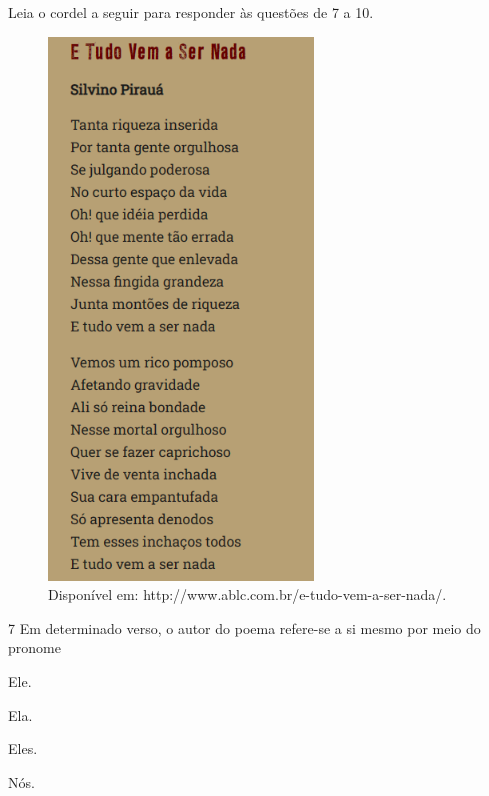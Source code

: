 


Leia o cordel a seguir para responder às questões de 7 a 10.

\begin{figure}[H]
\centering\includegraphics[width=2.77524in,height=5.66716in]{./imgSAEB_6_POR/media/image49.png}
\caption{Disponível em: http://www.ablc.com.br/e-tudo-vem-a-ser-nada/.}
\end{figure}


\num{7} Em determinado verso, o autor do poema refere-se a si mesmo por meio
  do pronome

\begin{escolha}
\item Ele.
\item Ela.
\item Eles.
\item Nós.
\end{escolha}

